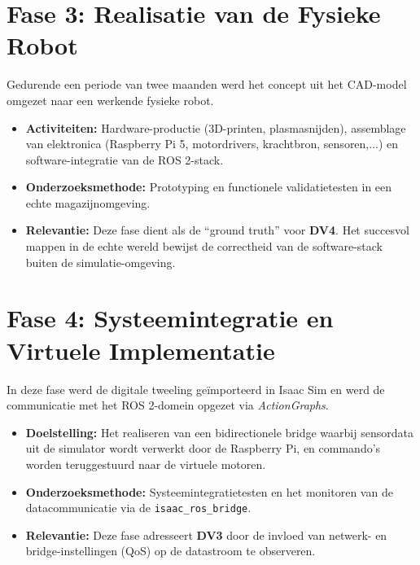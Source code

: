 \section{Fase 3: Realisatie van de Fysieke Robot}
Gedurende een periode van twee maanden werd het concept uit het CAD-model omgezet naar een werkende fysieke robot. 
\begin{itemize}
    \item \textbf{Activiteiten:} Hardware-productie (3D-printen, plasmasnijden), assemblage van elektronica (Raspberry Pi 5, motordrivers, krachtbron, sensoren,...) en software-integratie van de ROS 2-stack.
    \item \textbf{Onderzoeksmethode:} Prototyping en functionele validatietesten in een echte magazijnomgeving.
    \item \textbf{Relevantie:} Deze fase dient als de ``ground truth'' voor \textbf{DV4}. Het succesvol mappen in de echte wereld bewijst de correctheid van de software-stack buiten de simulatie-omgeving.
\end{itemize}

\section{Fase 4: Systeemintegratie en Virtuele Implementatie}
In deze fase werd de digitale tweeling geïmporteerd in Isaac Sim en werd de communicatie met het ROS 2-domein opgezet via \textit{ActionGraphs}.
\begin{itemize}
    \item \textbf{Doelstelling:} Het realiseren van een bidirectionele bridge waarbij sensordata uit de simulator wordt verwerkt door de Raspberry Pi, en commando's worden teruggestuurd naar de virtuele motoren.
    \item \textbf{Onderzoeksmethode:} Systeemintegratietesten en het monitoren van de datacommunicatie via de \texttt{isaac\_ros\_bridge}.
    \item \textbf{Relevantie:} Deze fase adresseert \textbf{DV3} door de invloed van netwerk- en bridge-instellingen (QoS) op de datastroom te observeren.
\end{itemize}

